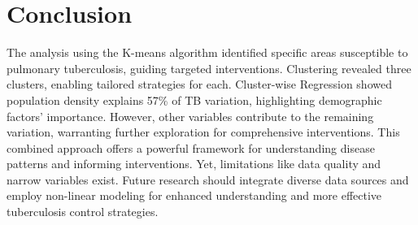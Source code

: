 \documentclass[conference]{IEEEtran}
\begin{document}
\section{Conclusion}
The analysis using the K-means algorithm identified specific areas susceptible to pulmonary tuberculosis, guiding targeted interventions. Clustering revealed three clusters, enabling tailored strategies for each. Cluster-wise Regression showed population density explains 57\% of TB variation, highlighting demographic factors' importance. However, other variables contribute to the remaining variation, warranting further exploration for comprehensive interventions. This combined approach offers a powerful framework for understanding disease patterns and informing interventions. Yet, limitations like data quality and narrow variables exist. Future research should integrate diverse data sources and employ non-linear modeling for enhanced understanding and more effective tuberculosis control strategies.
\end{document}
